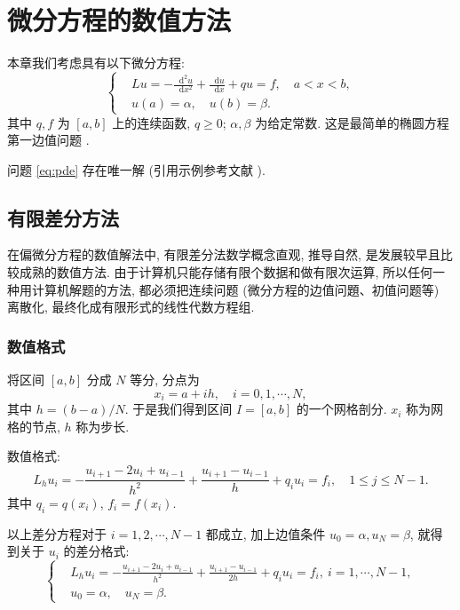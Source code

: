 \documentclass[zihao=-4,twoside,final]{ctexart}
\numberwithin{equation}{section}
\numberwithin{figure}{section}
\numberwithin{table}{section}
\theoremstyle{plain}
\newcommand{\dif}{\mathop{}\!\mathrm{d}}
\begin{document}

\clearpage

\section{微分方程的数值方法}

本章我们考虑具有以下微分方程:
\begin{equation}\label{eq:pde}
\left\{\begin{aligned}
& L u=-\frac{{\dif}^{2} u}{\dif x^{2}}+\frac{\dif u}{\dif x}+q u=f, \quad a < x < b, \\
& u(a)=\alpha, \quad u(b)=\beta.
\end{aligned}\right.
\end{equation}
其中 $q, f$ 为 $[a,b]$ 上的连续函数, $q \geqslant 0$; $\alpha, \beta$ 为给定常数. 这是最简单的椭圆方程第一边值问题 .

问题 \eqref{eq:pde} 存在唯一解 (引用示例参考文献 \cite{LiLiu1997}).


\subsection{有限差分方法}
在偏微分方程的数值解法中, 有限差分法数学概念直观, 推导自然, 是发展较早且比较成熟的数值方法. 由于计算机只能存储有限个数据和做有限次运算, 所以任何一种用计算机解题的方法, 都必须把连续问题 (微分方程的边值问題、初值问题等) 离散化, 最终化成有限形式的线性代数方程组.

\subsubsection{数值格式}
将区间 $[a,b]$ 分成 $N$ 等分, 分点为
\begin{equation*}
  x_{i}=a+i h, \quad i=0,1, \cdots, N,
\end{equation*}
其中 $h=(b-a) / N$. 于是我们得到区间 $I=[a,b]$ 的一个网格剖分. $x_i$ 称为网格的节点, $h$ 称为步长.

数值格式:
\begin{equation*}
  L_{h} u_{i}=-\frac{u_{i+1}-2 u_{i}+u_{i-1}}{h^{2}}+\frac{u_{i+1}-u_{i-1}}{h}+q_{i} u_{i}=f_{i},\quad 1 \leqslant j \leqslant N-1.
\end{equation*}
其中  $q_{i}=q(x_{i})$, $f_{i}=f(x_{i})$.

以上差分方程对于 $i=1,2, \cdots, N-1$ 都成立, 加上边值条件 $u_{0}=\alpha, u_{N}=\beta$, 就得到关于 $u_i$ 的差分格式:
\begin{equation}\label{eq:fdm}
\left\{\begin{aligned}
& L_{h} u_{i}=-\frac{u_{i+1}-2 u_{i}+u_{i-1}}{h^{2}}+\frac{u_{i+1}-u_{i-1}}{2h}+q_{i} u_{i}=f_{i}, ~ i=1, \cdots, N-1, \\
& u_{0}=\alpha, \quad u_{N}=\beta.
\end{aligned}\right.
\end{equation}
\end{document}

